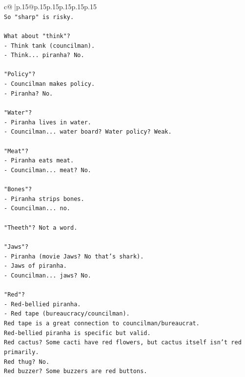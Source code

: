 \documentclass{article}
\begin{document}
{\begin{supertabular}{c@{$\;$}|p{.15\linewidth}@{}p{.15\linewidth}p{.15\linewidth}p{.15\linewidth}p{.15\linewidth}p{.15\linewidth}}
{{{\\ 
\texttt{So "sharp" is risky.} \\
\\ 
\texttt{What about "think"?} \\
\texttt{{-} Think tank (councilman).} \\
\texttt{{-} Think... piranha? No.} \\
\\ 
\texttt{"Policy"?} \\
\texttt{{-} Councilman makes policy.} \\
\texttt{{-} Piranha? No.} \\
\\ 
\texttt{"Water"?} \\
\texttt{{-} Piranha lives in water.} \\
\texttt{{-} Councilman... water board? Water policy? Weak.} \\
\\ 
\texttt{"Meat"?} \\
\texttt{{-} Piranha eats meat.} \\
\texttt{{-} Councilman... meat? No.} \\
\\ 
\texttt{"Bones"?} \\
\texttt{{-} Piranha strips bones.} \\
\texttt{{-} Councilman... no.} \\
\\ 
\texttt{"Theeth"? Not a word.} \\
\\ 
\texttt{"Jaws"?} \\
\texttt{{-} Piranha (movie Jaws? No that's shark).} \\
\texttt{{-} Jaws of piranha.} \\
\texttt{{-} Councilman... jaws? No.} \\
\\ 
\texttt{"Red"?} \\
\texttt{{-} Red{-}bellied piranha.} \\
\texttt{{-} Red tape (bureaucracy/councilman).} \\
\texttt{Red tape is a great connection to councilman/bureaucrat.} \\
\texttt{Red{-}bellied piranha is specific but valid.} \\
\texttt{Red cactus? Some cacti have red flowers, but cactus itself isn't red primarily.} \\
\texttt{Red thug? No.} \\
\texttt{Red buzzer? Some buzzers are red buttons.} \\
}}}
\end{supertabular}}
\end{document}

